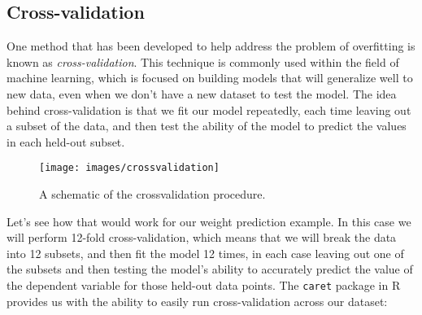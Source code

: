 \documentclass[]{book}
\theoremstyle{definition}
\theoremstyle{definition}
\theoremstyle{definition}
\theoremstyle{remark}
\begin{document}
\subsection{Cross-validation}\label{cross-validation}

One method that has been developed to help address the problem of
overfitting is known as \emph{cross-validation}. This technique is
commonly used within the field of machine learning, which is focused on
building models that will generalize well to new data, even when we
don't have a new dataset to test the model. The idea behind
cross-validation is that we fit our model repeatedly, each time leaving
out a subset of the data, and then test the ability of the model to
predict the values in each held-out subset.

\begin{figure}
\texttt{[image: images/crossvalidation]} \caption{A schematic of the  crossvalidation procedure.}\label{fig:crossvalidation}
\end{figure}

Let's see how that would work for our weight prediction example. In this
case we will perform 12-fold cross-validation, which means that we will
break the data into 12 subsets, and then fit the model 12 times, in each
case leaving out one of the subsets and then testing the model's ability
to accurately predict the value of the dependent variable for those
held-out data points. The \texttt{caret} package in R provides us with
the ability to easily run cross-validation across our dataset:
\end{document}

